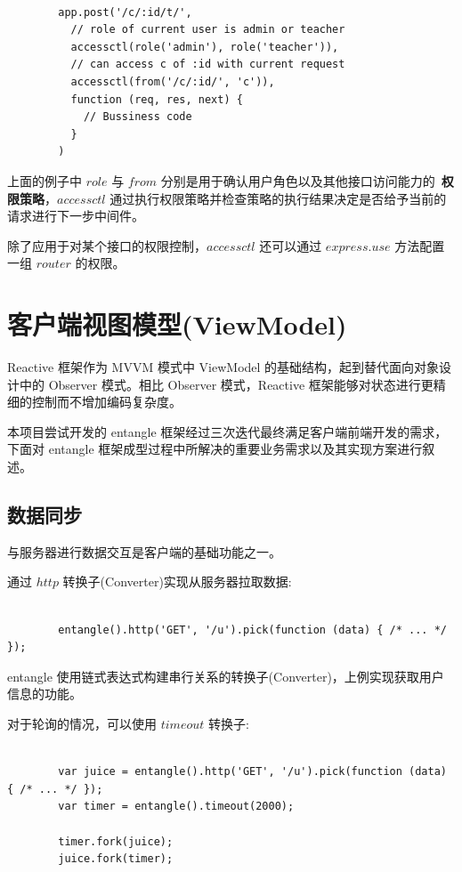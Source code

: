 \begin{verbatim}

        app.post('/c/:id/t/',
          // role of current user is admin or teacher
          accessctl(role('admin'), role('teacher')),
          // can access c of :id with current request
          accessctl(from('/c/:id/', 'c')),
          function (req, res, next) {
            // Bussiness code
          }
        )

\end{verbatim}

上面的例子中 $role$ 与 $from$ 分别是用于确认用户角色以及其他接口访问能力的~\textbf{权限策略}，$accessctl$ 通过执行权限策略并检查策略的执行结果决定是否给予当前的请求进行下一步中间件。

除了应用于对某个接口的权限控制，$accessctl$ 还可以通过 $express.use$ 方法配置一组 $router$ 的权限。

\section{客户端视图模型(ViewModel)}

Reactive 框架作为 MVVM 模式中 ViewModel 的基础结构，起到替代面向对象设计中的 Observer 模式。相比 Observer 模式，Reactive 框架能够对状态进行更精细的控制而不增加编码复杂度。

本项目尝试开发的 entangle 框架经过三次迭代最终满足客户端前端开发的需求，下面对 entangle 框架成型过程中所解决的重要业务需求以及其实现方案进行叙述。

\subsection{数据同步}

与服务器进行数据交互是客户端的基础功能之一。

通过 $http$ 转换子(Converter)实现从服务器拉取数据:

\begin{verbatim}

        entangle().http('GET', '/u').pick(function (data) { /* ... */ });

\end{verbatim}

entangle 使用链式表达式构建串行关系的转换子(Converter)，上例实现获取用户信息的功能。

对于轮询的情况，可以使用 $timeout$ 转换子:

\begin{verbatim}

        var juice = entangle().http('GET', '/u').pick(function (data) { /* ... */ });
        var timer = entangle().timeout(2000);

        timer.fork(juice);
        juice.fork(timer);

\end{verbatim}


